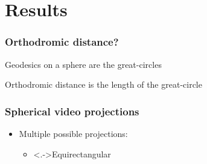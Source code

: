 \section{Results}

\begin{frame}[c]
   \frametitle{Orthodromic distance?}

   Geodesics on a sphere are the great-circles

   Orthodromic distance is the length of the great-circle

   \begin{independentCounter}
      \begin{center}
         
      \end{center}
   \end{independentCounter}

\end{frame}

\begin{frame}[c]
   \frametitle{Spherical video projections}

   \vfill

   \begin{itemize}
      \item<+-> Multiple possible projections:
      \begin{itemize}
         \item \uncover<.->{Equirectangular}
      \end{itemize}
   \end{itemize}

   \vfill

   \begin{independentCounter}
      \begin{center}
         
      \end{center}
   \end{independentCounter}

\end{frame}

